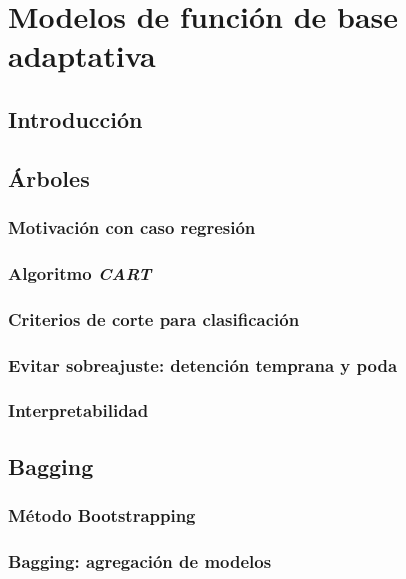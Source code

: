 \section{Modelos de función de base adaptativa}
\label{cap:adaptativa}

\subsection{Introducción}
\label{sec:intro_adap}


\subsection{Árboles}
\label{sec:arbol}

\subsubsection{Motivación con caso regresión}

\subsubsection{Algoritmo \textit{CART}}

\subsubsection{Criterios de corte para clasificación}

\subsubsection{Evitar sobreajuste: detención temprana y poda}

\subsubsection{Interpretabilidad}


\subsection{Bagging}
\label{sec:bagging}

\subsubsection{Método Bootstrapping}

\subsubsection{Bagging: agregación de modelos}


